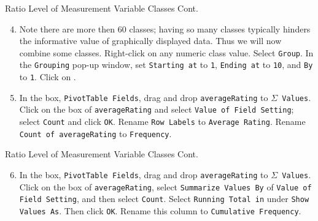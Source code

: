 \documentclass[pdf]{beamer}
\theoremstyle{remark}
\theoremstyle{definition}
\begin{document}
\begin{frame}[t]{Ratio Level of Measurement Variable Classes Cont.}
\begin{enumerate} 
\setcounter{enumi}{3}
\item Note there are more then 60 classes;  having so many classes typically hinders the informative value of graphically displayed data.  Thus we will now combine some classes.  Right-click on any numeric class value.  Select \texttt{Group}.  In the \texttt{Grouping} pop-up window, set \texttt{Starting at} to \texttt{1}, \texttt{Ending at} to \texttt{10}, and \texttt{By} to \texttt{1}.  Click on .
\item In the box, \texttt{PivotTable Fields}, drag and drop \texttt{averageRating} to \texttt{$\Sigma$ Values}.  Click on the box of \texttt{averageRating} and select \texttt{Value of Field Setting};  select \texttt{Count} and click \texttt{OK}.  Rename \texttt{Row Labels} to \texttt{Average Rating}. Rename \texttt{Count of averageRating} to \texttt{Frequency}.
\end{enumerate}
\normalsize
\end{frame}

\begin{frame}[t]{Ratio Level of Measurement Variable Classes Cont.}
\begin{enumerate} 
\setcounter{enumi}{5}
\item In the box, \texttt{PivotTable Fields}, drag and drop \texttt{averageRating} to \texttt{$\Sigma$ Values}.  Click on the box of \texttt{averageRating}, select \texttt{Summarize Values By} of \texttt{Value of Field Setting}, and then select \texttt{Count}. Select \texttt{Running Total in} under \texttt{Show Values As}.  Then click \texttt{OK}. Rename this column to \texttt{Cumulative Frequency}. 
\end{enumerate}
\end{frame}
\end{document}
